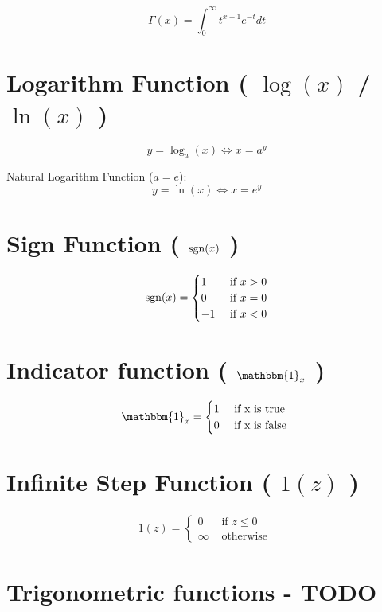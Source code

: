 \[
    \Gamma(x) = \displaystyle\int_{0}^{\infty} t^{x-1} e^{-t} dt
\]


\section{Logarithm Function ( $\log(x)$ / $\ln(x)$ )}\label{Logarithm Function}
\[
    y = \log_a(x) \Leftrightarrow x = a^y
\]

Natural Logarithm Function ($a=e$):
\[
    y = \ln(x) \Leftrightarrow x = e^y
\]


\section{Sign Function ( $\operatorname{sgn}(x)$ )}\label{Sign Function}
\begin{align}
    \operatorname{sgn}(x) = \begin{cases}
         1 & \text{ if } x > 0 \\
         0 & \text{ if } x = 0 \\
         -1 & \text{ if } x < 0 
        \end{cases}
\end{align}



\section{Indicator function ( $\mathbbm{1}_x$ )}\label{Indicator function}

\begin{align}
    \mathbbm{1}_x = {\begin{cases}
        1 & \text{ if x is true } \\
        0 & \text{ if x is false }
    \end{cases}}
\end{align}

\section{Infinite Step Function ( $1(z)$ )}

\begin{align}
    1(z) = {\begin{cases}
        0 & \text{ if } z \leq 0 \\
        \infty & \text{ otherwise }
    \end{cases}}
\end{align}

\section{Trigonometric functions - TODO \cite{wiki-Trigonometric_functions}}\label{Trigonometric_functions}

